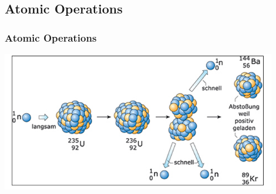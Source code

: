 \subsection{Atomic Operations}
\begin{frame}
\frametitle{Atomic Operations}
	\includegraphics[width=0.9\textwidth]{img/controlled-chain-reaction.png}
\end{frame}
